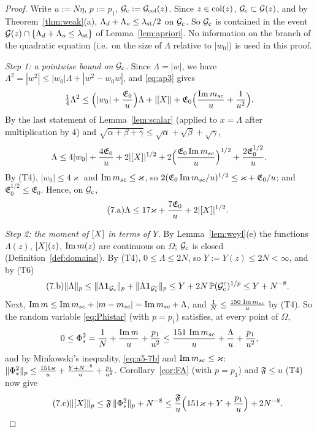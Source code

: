 \begin{proof}
Write $u:=N\eta$, $p:=p_1$, $\mathcal{G}_{\rm c}:=\mathcal{G}_{\rm col}(z)$. Since $z\in{\rm col}(z)$, $\mathcal{G}_{\rm c}\subset\mathcal{G}(z)$, and by Theorem~\ref{thm:weak}(a), $\Lambda_d+\Lambda_o\le\lambda_{\rm st}/2$ on $\mathcal{G}_{\rm c}$. So $\mathcal{G}_{\rm c}$ is contained in the event $\mathcal{G}(z)\cap\{\Lambda_d+\Lambda_o\le\lambda_{\rm st}\}$ of Lemma~\ref{lem:apriori}.
No information on the branch of the quadratic equation (i.e.\ on the size of $\Lambda$ relative to $|w_0|$) is used in this proof.

\emph{Step 1: a pointwise bound on $\mathcal{G}_{\rm c}$.} Since $\Lambda=|w|$, we have $\Lambda^2=|w^2|\le|w_0|\Lambda+|w^2-w_0w|$, and \eqref{eq:ap3} gives
\[
 \tfrac14\Lambda^2\le\Big(|w_0|+\frac{\mathfrak E_0}{u}\Big)\Lambda+|[X]|+\mathfrak E_0\Big(\frac{\operatorname{Im}m_{sc}}{u}+\frac1{u^2}\Big).
\]
By the last statement of Lemma~\ref{lem:scalar} (applied to $x=\Lambda$ after multiplication by $4$) and $\sqrt{\alpha+\beta+\gamma}\le\sqrt\alpha+\sqrt\beta+\sqrt\gamma$,
\[
 \Lambda\le4|w_0|+\frac{4\mathfrak E_0}{u}+2|[X]|^{1/2}+2\Big(\frac{\mathfrak E_0\operatorname{Im}m_{sc}}{u}\Big)^{1/2}+\frac{2\mathfrak E_0^{1/2}}{u}.
\]
By (T4), $|w_0|\le4\varkappa$ and $\operatorname{Im}m_{sc}\le\varkappa$, so $2(\mathfrak E_0\operatorname{Im}m_{sc}/u)^{1/2}\le\varkappa+\mathfrak E_0/u$; and $\mathfrak E_0^{1/2}\le\mathfrak E_0$. Hence, on $\mathcal{G}_{\rm c}$,
\begin{equation}\tag{7.a}\label{eq:a5-7a}
 \Lambda\le17\varkappa+\frac{7\mathfrak E_0}{u}+2|[X]|^{1/2}.
\end{equation}

\emph{Step 2: the moment of $[X]$ in terms of $Y$.} By Lemma~\ref{lem:weyl}(e) the functions $\Lambda(z)$, $[X](z)$, $\operatorname{Im} m(z)$ are continuous on $\Omega$; $\mathcal{G}_{\rm c}$ is closed (Definition~\ref{def:domains}). By (T4), $0\le\Lambda\le2N$, so $Y:=Y(z)\le2N<\infty$, and by (T6)
\begin{equation}\tag{7.b}\label{eq:a5-7b}
 \|\Lambda\|_p\le\|\Lambda\mathbf{1}_{\mathcal{G}_{\rm c}}\|_p+\|\Lambda\mathbf{1}_{\mathcal{G}_{\rm c}^c}\|_p\le Y+2N\,\mathbb{P}(\mathcal{G}_{\rm c}^c)^{1/p}\le Y+N^{-8}.
\end{equation}
Next, $\operatorname{Im} m\le\operatorname{Im}m_{sc}+|m-m_{sc}|=\operatorname{Im}m_{sc}+\Lambda$, and $\frac1N\le\frac{150\,\operatorname{Im}m_{sc}}{u}$ by (T4). So the random variable \eqref{eq:Phistar} (with $p=p_1$) satisfies, at every point of $\Omega$,
\[
 0\le\Phi_*^2=\frac1N+\frac{\operatorname{Im} m}{u}+\frac{p_1}{u^2}\le\frac{151\,\operatorname{Im}m_{sc}}{u}+\frac{\Lambda}{u}+\frac{p_1}{u^2},
\]
and by Minkowski's inequality, \eqref{eq:a5-7b} and $\operatorname{Im}m_{sc}\le\varkappa$: $\|\Phi_*^2\|_p\le\frac{151\varkappa}u+\frac{Y+N^{-8}}u+\frac{p_1}{u^2}$. Corollary~\ref{cor:FA} (with $p=p_1$) and $\mathfrak F\le u$ (T4) now give
\begin{equation}\tag{7.c}\label{eq:a5-7c}
 \|[X]\|_p\le\mathfrak F\,\|\Phi_*^2\|_p+N^{-8}\le\frac{\mathfrak F}{u}\Big(151\varkappa+Y+\frac{p_1}u\Big)+2N^{-8}.
\end{equation}


\end{proof}
